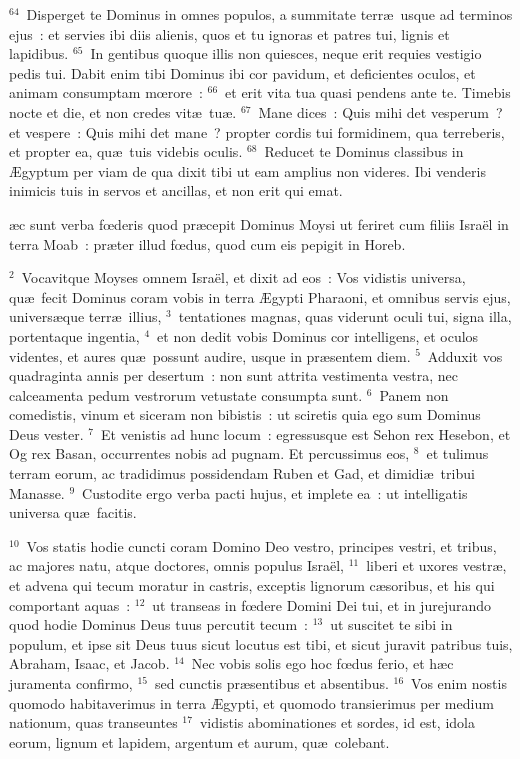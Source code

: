 ${}^{64}$~Disperget te Dominus in omnes populos, a summitate terr\ae\ usque ad terminos ejus~: et servies ibi diis alienis, quos et tu ignoras et patres tui, lignis et lapidibus.
${}^{65}$~In gentibus quoque illis non quiesces, neque erit requies vestigio pedis tui. Dabit enim tibi Dominus ibi cor pavidum, et deficientes oculos, et animam consumptam mœrore~:
${}^{66}$~et erit vita tua quasi pendens ante te. Timebis nocte et die, et non credes vit\ae\ tu\ae .
${}^{67}$~Mane dices~: Quis mihi det vesperum~? et vespere~: Quis mihi det mane~? propter cordis tui formidinem, qua terreberis, et propter ea, qu\ae\ tuis videbis oculis.
${}^{68}$~Reducet te Dominus classibus in \AE gyptum per viam de qua dixit tibi ut eam amplius non videres. Ibi venderis inimicis tuis in servos et ancillas, et non erit qui emat.

\bchapter
{}\ae c sunt verba fœderis quod pr\ae cepit Dominus Moysi ut feriret cum filiis Isra\"el in terra Moab~: pr\ae ter illud fœdus, quod cum eis pepigit in Horeb.


${}^{2}$~Vocavitque Moyses omnem Isra\"el, et dixit ad eos~: Vos vidistis universa, qu\ae\ fecit Dominus coram vobis in terra \AE gypti Pharaoni, et omnibus servis ejus, univers\ae que terr\ae\ illius,
${}^{3}$~tentationes magnas, quas viderunt oculi tui, signa illa, portentaque ingentia,
${}^{4}$~et non dedit vobis Dominus cor intelligens, et oculos videntes, et aures qu\ae\ possunt audire, usque in pr\ae sentem diem.
${}^{5}$~Adduxit vos quadraginta annis per desertum~: non sunt attrita vestimenta vestra, nec calceamenta pedum vestrorum vetustate consumpta sunt.
${}^{6}$~Panem non comedistis, vinum et siceram non bibistis~: ut sciretis quia ego sum Dominus Deus vester.
${}^{7}$~Et venistis ad hunc locum~: egressusque est Sehon rex Hesebon, et Og rex Basan, occurrentes nobis ad pugnam. Et percussimus eos,
${}^{8}$~et tulimus terram eorum, ac tradidimus possidendam Ruben et Gad, et dimidi\ae\ tribui Manasse.
${}^{9}$~Custodite ergo verba pacti hujus, et implete ea~: ut intelligatis universa qu\ae\ facitis.


${}^{10}$~Vos statis hodie cuncti coram Domino Deo vestro, principes vestri, et tribus, ac majores natu, atque doctores, omnis populus Isra\"el,
${}^{11}$~liberi et uxores vestr\ae , et advena qui tecum moratur in castris, exceptis lignorum c\ae soribus, et his qui comportant aquas~:
${}^{12}$~ut transeas in fœdere Domini Dei tui, et in jurejurando quod hodie Dominus Deus tuus percutit tecum~:
${}^{13}$~ut suscitet te sibi in populum, et ipse sit Deus tuus sicut locutus est tibi, et sicut juravit patribus tuis, Abraham, Isaac, et Jacob.
${}^{14}$~Nec vobis solis ego hoc fœdus ferio, et h\ae c juramenta confirmo,
${}^{15}$~sed cunctis pr\ae sentibus et absentibus.
${}^{16}$~Vos enim nostis quomodo habitaverimus in terra \AE gypti, et quomodo transierimus per medium nationum, quas transeuntes
${}^{17}$~vidistis abominationes et sordes, id est, idola eorum, lignum et lapidem, argentum et aurum, qu\ae\ colebant.


